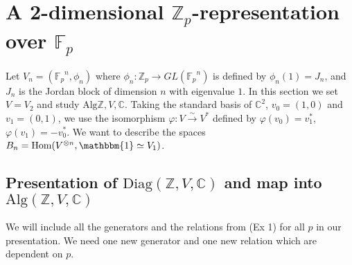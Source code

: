 \documentclass[11pt]{article} %
\begin{document}
\section{A 2-dimensional $\mathbb{Z}_p$-representation over $\mathbb{F}_p$}

Let $V_n=({\mathbb{F}_p}^n,\phi_n)$ where $\phi_n: \mathbb{Z}_p \rightarrow GL({\mathbb{F}_p}^n)$ is defined by $\phi_n(1)=J_n$, and $J_n$ is the Jordan block of dimension $n$ with eigenvalue $1$. In this section we set $V=V_2$ and study $\text{Alg}{\mathbb{Z},V, \mathbb{C}}$. Taking the standard basis of $\mathbb{C}^2$, $v_0 = (1,0)$ and  $v_1 = (0,1)$, we use the isomorphism $\varphi:V \xrightarrow{\sim} V^{\ast}$ defined by $\varphi(v_0)=v_1^{\ast}$, $\varphi(v_1)=-v_0^{\ast}$. We want to describe the spaces $B_n = \text{Hom}(V^{\otimes n},\mathbbm{1} \simeq V_1)$.

\subsection {Presentation of $\text{Diag}{(\mathbb{Z},V,\mathbb{C})}$ and map into $\text{Alg}{(\mathbb{Z},V,\mathbb{C})}$}

We will include all the generators and the relations from (Ex 1) for all $p$ in our presentation. We need one new generator and one new relation which are dependent on $p$.
\end{document}
